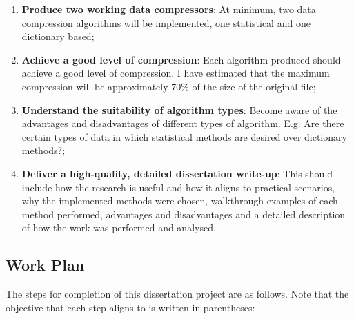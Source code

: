 \documentclass[12pt]{article}
\begin{document}
	\begin{enumerate}
		\item \textbf{Produce two working data compressors}: At minimum, two data compression algorithms will be implemented, one statistical and one dictionary based;
		
		\item \textbf{Achieve a good level of compression}: Each algorithm produced should achieve a good level of compression. I have estimated that the maximum compression will be approximately 70\% of the size of the original file;
		
		\item \textbf{Understand the suitability of algorithm types}: Become aware of the advantages and disadvantages of different types of algorithm. E.g. Are there certain types of data in which statistical methods are desired over dictionary methods?;
		
		\item \textbf{Deliver a high-quality, detailed dissertation write-up}: This should include how the research is useful and how it aligns to practical scenarios, why the implemented methods were chosen, walkthrough examples of each method performed, advantages and disadvantages and a detailed description of how the work was performed and analysed.
	\end{enumerate}
	
	\subsection{Work Plan}
	The steps for completion of this dissertation project are as follows. Note that the objective that each step aligns to is written in parentheses:
	
\end{document}
